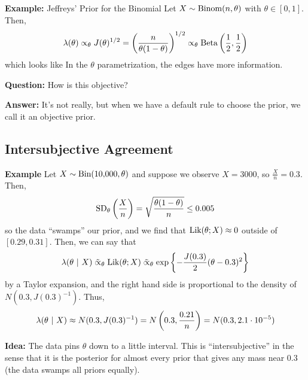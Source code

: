 \begin{example}{\textbf{Example:} Jeffreys' Prior for the Binomial}
    Let $X \sim \Binom(n, \theta)$ with $\theta \in [0, 1]$. Then,
    \[ \lambda(\theta) \propto_{\theta} J(\theta)^{1/2} = \left(\frac{n}{\theta(1 - \theta)}\right)^{1/2} \propto_{\theta} \tt{Beta}\left(\frac{1}{2}, \frac{1}{2}\right) \]
    which looks like
    \vspace{-0.5cm}
    In the $\theta$ parametrization, the edges have more information.
\end{example}

\textbf{Question:} How is this objective?

\textbf{Answer:} It's not really, but when we have a default rule to choose the prior, we call it an objective prior. 

\subsection*{Intersubjective Agreement}
\sectionspace

\begin{example}{\textbf{Example}}
    Let $X \sim \tt{Bin}(10{,}000, \theta)$ and suppose we observe $X = 3000$, so $\frac{X}{n} = 0.3$. Then,
    \[ \tt{SD}_{\theta}\left(\frac{X}{n}\right) = \sqrt{\frac{\theta(1 - \theta)}{n}} \leq 0.005 \]
    so the data ``swamps'' our prior, and we find that $\tt{Lik}(\theta; X) \approx 0$ outside of $[0.29, 0.31]$. Then, we can say that
    \[ \lambda(\theta \given X) \mathrel{\tilde{\propto}_{\theta}} \tt{Lik}(\theta; X) \mathrel{\tilde{\propto}_{\theta}} \exp\left\{-\frac{J(0.3)}{2}(\theta - 0.3)^2\right\} \]
    by a Taylor expansion, and the right hand side is proportional to the density of $N(0.3, J(0.3)^{-1})$. Thus,
    \[ \lambda(\theta \given X) \approx N(0.3, J(0.3)^{-1}) = N\left(0.3, \frac{0.21}{n}\right) = N(0.3, 2.1 \cdot 10^{-5}) \]
\end{example}

\textbf{Idea:} The data pins $\theta$ down to a little interval. This is ``intersubjective'' in the sense that it is the posterior for almost every prior that gives any mass near $0.3$ (the data swamps all priors equally).

